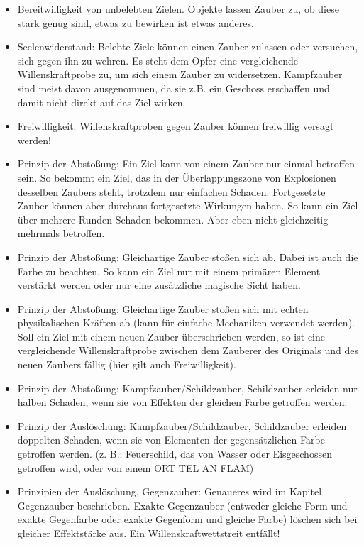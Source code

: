 \documentclass{article}
\begin{document}
\begin{itemize}
\item Bereitwilligkeit von unbelebten Zielen. Objekte lassen Zauber zu, ob diese stark genug sind, etwas zu bewirken ist etwas anderes.
\item Seelenwiderstand: Belebte Ziele können einen Zauber zulassen oder versuchen, sich gegen ihn zu wehren. Es steht dem Opfer eine vergleichende Willenskraftprobe zu, um sich einem Zauber zu widersetzen. Kampfzauber sind meist davon ausgenommen, da sie z.B. ein Geschoss erschaffen und damit nicht direkt auf das Ziel wirken.
\item Freiwilligkeit: Willenskraftproben gegen Zauber können freiwillig versagt werden!
\item Prinzip der Abstoßung: Ein Ziel kann von einem Zauber nur einmal betroffen sein. So bekommt ein Ziel, das in der Überlappungszone von Explosionen desselben Zaubers steht, trotzdem nur einfachen Schaden. Fortgesetzte Zauber können aber durchaus fortgesetzte Wirkungen haben. So kann ein Ziel über mehrere Runden Schaden bekommen. Aber eben nicht gleichzeitig mehrmals betroffen.
\item Prinzip der Abstoßung: Gleichartige Zauber stoßen sich ab. Dabei ist auch die Farbe zu beachten. So kann ein Ziel nur mit einem primären Element verstärkt werden oder nur eine zusätzliche magische Sicht haben.
\item Prinzip der Abstoßung: Gleichartige Zauber stoßen sich mit echten physikalischen Kräften ab (kann für einfache Mechaniken verwendet werden). Soll ein Ziel mit einem neuen Zauber überschrieben werden, so ist eine vergleichende Willenskraftprobe zwischen dem Zauberer des Originals und des neuen Zaubers fällig (hier gilt auch Freiwilligkeit).
\item Prinzip der Abstoßung: Kampfzauber/Schildzauber, Schildzauber erleiden nur halben Schaden, wenn sie von Effekten der gleichen Farbe getroffen werden.
\item Prinzip der Auslöschung: Kampfzauber/Schildzauber, Schildzauber erleiden doppelten Schaden, wenn sie von Elementen der gegensätzlichen Farbe getroffen werden. (z. B.: Feuerschild, das von Wasser oder Eisgeschossen getroffen wird, oder von einem ORT TEL AN FLAM)
\item Prinzipien der Auslöschung, Gegenzauber: Genaueres wird im Kapitel Gegenzauber beschrieben. Exakte Gegenzauber (entweder gleiche Form und exakte Gegenfarbe oder exakte Gegenform und gleiche Farbe) löschen sich bei gleicher Effektstärke aus. Ein Willenskraftwettstreit entfällt!
\end{itemize}
\end{document}
